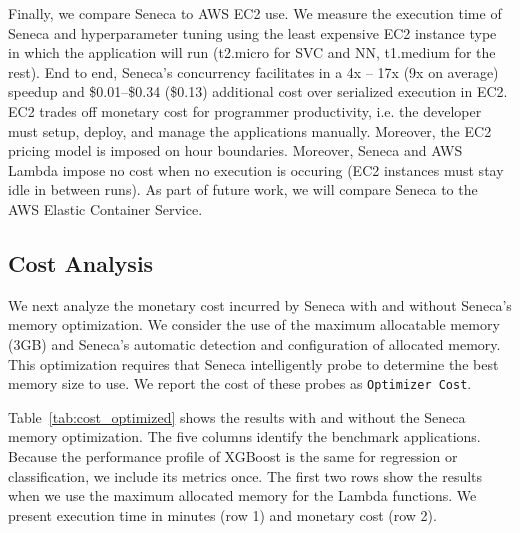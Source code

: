 Finally, we compare Seneca to AWS EC2 use.
We measure the execution time of Seneca and hyperparameter tuning 
using the least expensive EC2 instance type in which the application
will run (t2.micro for SVC and NN, t1.medium for the rest).  End to end, Seneca's
concurrency facilitates in a 4x -- 17x (9x on average) speedup
and \$0.01--\$0.34 (\$0.13) additional cost over serialized execution in EC2.
EC2 trades off monetary cost for programmer productivity, i.e. the developer 
must setup, deploy, and manage the applications manually. Moreover, the EC2
pricing model is imposed on hour boundaries. Moreover, Seneca and 
AWS Lambda impose no cost when no execution is occuring (EC2 instances must
stay idle in between runs). As part of future work, we will compare Seneca
to the AWS Elastic Container Service.


\subsection{Cost Analysis}

We next analyze the monetary cost incurred by Seneca with and without 
Seneca's memory optimization.
We consider the use of the maximum allocatable memory (3GB) and Seneca's 
automatic detection and configuration of allocated memory.
This optimization requires
that Seneca intelligently probe to determine the best memory size 
to use.  We report the cost of these probes as \texttt{Optimizer Cost}.

Table~\ref{tab:cost_optimized} shows the results with and without
the Seneca memory optimization. 
The five columns identify the benchmark applications.
Because the performance profile of XGBoost is the same for regression
or classification, we include its metrics once.
The first two rows show the results when we use the maximum allocated memory 
for the Lambda functions. We present execution time in minutes (row 1) and 
monetary cost (row 2).

